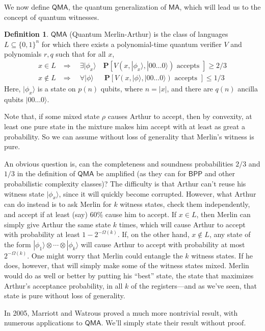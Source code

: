 \documentclass[12pt]{report}
\theoremstyle{plain}
\theoremstyle{definition}
\newtheorem{definition}[theorem]{Definition}
\renewcommand{\Pr}{\mathbf{P}}
\renewcommand{\ket}[1]{|#1\rangle}
\begin{document}
We now define $\mathsf{QMA}$, the quantum generalization of $\mathsf{MA}$, which will lead us to the concept of quantum witnesses.

\begin{definition}
$\mathsf{QMA}$ (Quantum Merlin-Arthur) is the class of languages $L \subseteq \{0,1\}^n$ for which there exists a polynomial-time quantum verifier $V$ and polynomials $r,q$ such that for all $x$,
\begin{align*}
x \in L & \Rightarrow \quad \exists \ket{\phi_x} \quad  \Pr[V(x,\ket{\phi_x},\ket{00\dots 0}) \text{ accepts }]    \geq 2/3 \\
x \notin L & \Rightarrow \quad \forall \ket{\phi}  \quad \; \ \Pr[V(x,\ket{\phi},\ket{00\dots 0}) \text{ accepts }]    \leq  1/3
\end{align*}
Here, $\ket{\phi_x}$ is a state on $p(n)$ qubits, where $n=|x|$, and there are $q(n)$ ancilla qubits $\ket{00\dots 0}$.
\end{definition}

Note that, if some mixed state $\rho$ causes Arthur to accept, then by convexity, at least one pure state in the mixture makes him accept with at least as great a probability.  So we can assume without loss of generality that Merlin's witness is pure.

An obvious question is, can the completeness and soundness probabilities $2/3$ and $1/3$ in the definition of $\mathsf{QMA}$ be amplified (as they can for
$\mathsf{BPP}$ and other probabilistic complexity classes)?  The difficulty is that Arthur can't reuse his witness state $\ket{\phi_x}$, since it will quickly become corrupted.  However, what Arthur can do instead is to ask Merlin for $k$ witness states, check them independently, and accept if at least (say) $60\%$ cause him to accept.  If $x \in L$, then Merlin can simply give Arthur the same state $k$ times, which will cause Arthur to accept with probability at least $1-2^{-\Omega(k)}$.  If, on the other hand, $x \notin L$, any state of the form $\ket{\phi_1}\otimes \cdots \otimes \ket{\phi_k}$ will cause Arthur to accept with probability at most $2^{-\Omega(k)}$. One might worry that Merlin could entangle the $k$ witness states. If he does, however, that will simply make some of the witness states mixed. Merlin would do as well or better by putting his ``best'' state, the state that maximizes Arthur's acceptance probability, in all $k$ of the registers---and as we've seen, that state is pure without loss of generality.

In 2005, Marriott and Watrous \cite{DBLP:journals/cc/MarriottW05} proved a much more nontrivial result, with numerous applications to $\mathsf{QMA}$. We'll simply state their result without proof.
\end{document}
